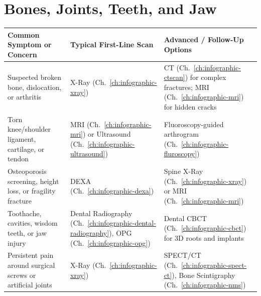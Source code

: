 \section{Bones, Joints, Teeth, and Jaw}
{\renewcommand{\arraystretch}{1.25}\noindent
\begin{tabularx}{\textwidth}{@{}p{} p{} X@{}}
\toprule
\textbf{Common Symptom or Concern} & \textbf{Typical First-Line Scan} & \textbf{Advanced / Follow-Up Options} \\
\midrule
Suspected broken bone, dislocation, or arthritis & X-Ray (Ch.~\ref{ch:infographic-xray}) & CT (Ch.~\ref{ch:infographic-ctscan}) for complex fractures; MRI (Ch.~\ref{ch:infographic-mri}) for hidden cracks \\
Torn knee/shoulder ligament, cartilage, or tendon & MRI (Ch.~\ref{ch:infographic-mri}) or Ultrasound (Ch.~\ref{ch:infographic-ultrasound}) & Fluoroscopy-guided arthrogram (Ch.~\ref{ch:infographic-fluroscopy}) \\
Osteoporosis screening, height loss, or fragility fracture & DEXA (Ch.~\ref{ch:infographic-dexa}) & Spine X-Ray (Ch.~\ref{ch:infographic-xray}) or MRI (Ch.~\ref{ch:infographic-mri}) \\
Toothache, cavities, wisdom teeth, or jaw injury & Dental Radiography (Ch.~\ref{ch:infographic-dental-radiography}), OPG (Ch.~\ref{ch:infographic-opg}) & Dental CBCT (Ch.~\ref{ch:infographic-cbct}) for 3D roots and implants \\
Persistent pain around surgical screws or artificial joints & X-Ray (Ch.~\ref{ch:infographic-xray}) & SPECT/CT (Ch.~\ref{ch:infographic-spect-ct}), Bone Scintigraphy (Ch.~\ref{ch:infographic-nms}) \\
\bottomrule
\end{tabularx}}

